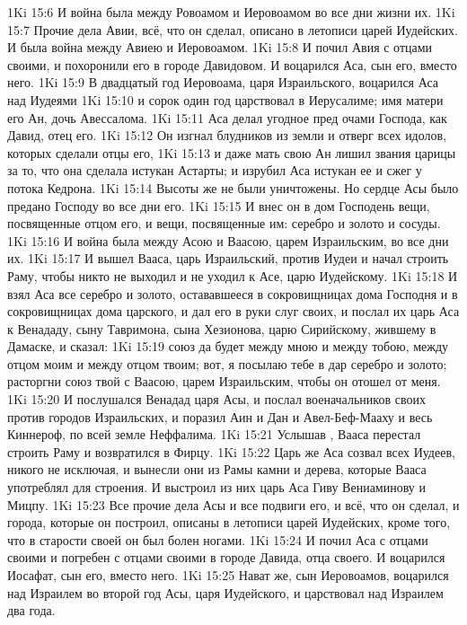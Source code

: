 \vs 1Ki 15:6 И война была между Ровоамом и Иеровоамом во все дни жизни их.
\rsbpar\vs 1Ki 15:7 Прочие дела Авии, всё, что он сделал, описано в летописи царей Иудейских. И была война между Авиею и Иеровоамом.
\vs 1Ki 15:8 И почил Авия с отцами своими, и похоронили его в городе Давидовом. И воцарился Аса, сын его, вместо него.
\rsbpar\vs 1Ki 15:9 В двадцатый год  Иеровоама, царя Израильского, воцарился Аса над Иудеями
\vs 1Ki 15:10 и сорок один год царствовал в Иерусалиме; имя матери его Ан, дочь Авессалома.
\vs 1Ki 15:11 Аса делал угодное пред очами Господа, как Давид, отец его.
\vs 1Ki 15:12 Он изгнал блудников из земли и отверг всех идолов, которых сделали отцы его,
\vs 1Ki 15:13 и даже мать свою Ан лишил звания царицы за то, что она сделала истукан Астарты; и изрубил Аса истукан ее и сжег у потока Кедрона.
\vs 1Ki 15:14 Высоты же не были уничтожены. Но сердце Асы было предано Господу во все дни его.
\vs 1Ki 15:15 И внес он в дом Господень вещи, посвященные отцом его, и вещи, посвященные им: серебро и золото и сосуды.
\vs 1Ki 15:16 И война была между Асою и Ваасою, царем Израильским, во все дни их.
\vs 1Ki 15:17 И вышел Вааса, царь Израильский, против Иудеи и начал строить Раму, чтобы никто не выходил и не уходил к Асе, царю Иудейскому.
\vs 1Ki 15:18 И взял Аса все серебро и золото, остававшееся в сокровищницах дома Господня и в сокровищницах дома царского, и дал его в руки слуг своих, и послал их царь Аса к Венададу, сыну Тавримона, сына Хезионова, царю Сирийскому, жившему в Дамаске, и сказал:
\vs 1Ki 15:19 союз да будет между мною и между тобою,  между отцом моим и между отцом твоим; вот, я посылаю тебе в дар серебро и золото; расторгни союз твой с Ваасою, царем Израильским, чтобы он отошел от меня.
\vs 1Ki 15:20 И послушался Венадад царя Асы, и послал военачальников своих против городов Израильских, и поразил Аин и Дан и Авел-Беф-Мааху и весь Киннероф, по всей земле Неффалима.
\vs 1Ki 15:21 Услышав , Вааса перестал строить Раму и возвратился в Фирцу.
\vs 1Ki 15:22 Царь же Аса созвал всех Иудеев, никого не исключая, и вынесли они из Рамы камни и дерева, которые Вааса употреблял для строения. И выстроил из них царь Аса Гиву Вениаминову и Мицпу.
\rsbpar\vs 1Ki 15:23 Все прочие дела Асы и все подвиги его, и всё, что он сделал, и города, которые он построил, описаны в летописи царей Иудейских, кроме того, что в старости своей он был болен ногами.
\vs 1Ki 15:24 И почил Аса с отцами своими и погребен с отцами своими в городе Давида, отца своего. И воцарился Иосафат, сын его, вместо него.
\rsbpar\vs 1Ki 15:25 Нават же, сын Иеровоамов, воцарился над Израилем во второй год Асы, царя Иудейского, и царствовал над Израилем два года.
